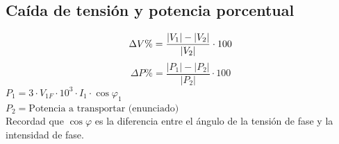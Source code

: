 \documentclass[10pt,a4paper]{article}
\begin{document}
\subsection{Caída de tensión y potencia porcentual}
$$
\Delta V \%=\frac{\left|V_{1}\right|-\left|V_{2}\right|}{\left|V_{2}\right|} \cdot 100 \\
$$
$$
\Delta P \%=\frac{\left|P_{1}\right|-\left|P_{2}\right|}{\left|P_{2}\right|} \cdot 100
$$
$
P_{1}=3\cdot  V_{1F}\cdot 10^3 \cdot I_{1} \cdot \cos \varphi_{1}
$\\
$
P_{2}= \text{Potencia a transportar (enunciado)}
$
\\
Recordad que $\cos \varphi$ es la diferencia entre el ángulo de la tensión de fase y la intensidad de fase.
\end{document}
